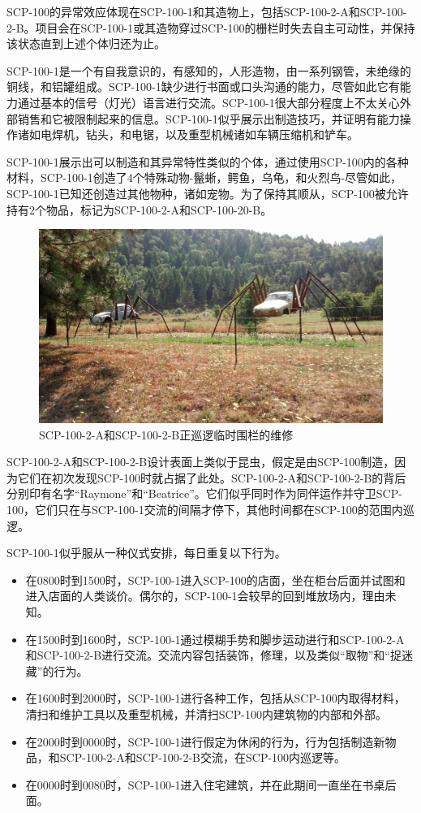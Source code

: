 SCP-100的异常效应体现在SCP-100-1和其造物上，包括SCP-100-2-A和SCP-100-2-B。项目会在SCP-100-1或其造物穿过SCP-100的栅栏时失去自主可动性，并保持该状态直到上述个体归还为止。

SCP-100-1是一个有自我意识的，有感知的，人形造物，由一系列钢管，未绝缘的铜线，和铝罐组成。SCP-100-1缺少进行书面或口头沟通的能力，尽管如此它有能力通过基本的信号（灯光）语言进行交流。SCP-100-1很大部分程度上不太关心外部销售和它被限制起来的信息。SCP-100-1似乎展示出制造技巧，并证明有能力操作诸如电焊机，钻头，和电锯，以及重型机械诸如车辆压缩机和铲车。

SCP-100-1展示出可以制造和其异常特性类似的个体，通过使用SCP-100内的各种材料，SCP-100-1创造了4个特殊动物-鬣蜥，鳄鱼，乌龟，和火烈鸟-尽管如此，SCP-100-1已知还创造过其他物种，诸如宠物。为了保持其顺从，SCP-100被允许持有2个物品，标记为SCP-100-2-A和SCP-100-20-B。

\begin{figure}[H]
    \centering
    \includegraphics[width=0.5\linewidth]{images/SCP-100-2.jpg}
    \caption*{SCP-100-2-A和SCP-100-2-B正巡逻临时围栏的维修}
\end{figure}

SCP-100-2-A和SCP-100-2-B设计表面上类似于昆虫，假定是由SCP-100制造，因为它们在初次发现SCP-100时就占据了此处。SCP-100-2-A和SCP-100-2-B的背后分别印有名字“Raymone”和“Beatrice”。它们似乎同时作为同伴运作并守卫SCP-100，它们只在与SCP-100-1交流的间隔才停下，其他时间都在SCP-100的范围内巡逻。

SCP-100-1似乎服从一种仪式安排，每日重复以下行为。

\begin{itemize}
\item 在0800时到1500时，SCP-100-1进入SCP-100的店面，坐在柜台后面并试图和进入店面的人类谈价。偶尔的，SCP-100-1会较早的回到堆放场内，理由未知。
\item 在1500时到1600时，SCP-100-1通过模糊手势和脚步运动进行和SCP-100-2-A和SCP-100-2-B进行交流。交流内容包括装饰，修理，以及类似“取物”和“捉迷藏”的行为。
\item 在1600时到2000时，SCP-100-1进行各种工作，包括从SCP-100内取得材料，清扫和维护工具以及重型机械，并清扫SCP-100内建筑物的内部和外部。
\item 在2000时到0000时，SCP-100-1进行假定为休闲的行为，行为包括制造新物品，和SCP-100-2-A和SCP-100-2-B交流，在SCP-100内巡逻等。
\item 在0000时到0080时，SCP-100-1进入住宅建筑，并在此期间一直坐在书桌后面。
\end{itemize}

